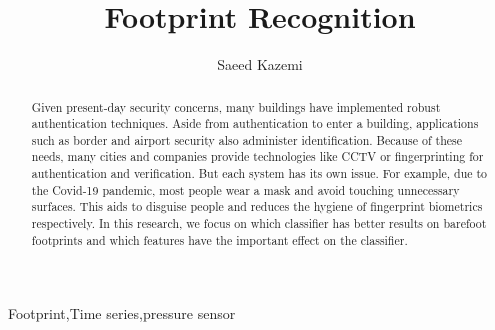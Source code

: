 \begin{frontmatter}

\title{Footprint Recognition}


\author{Saeed Kazemi}
\address{University of New Brunswick}


\begin{abstract}
Given present-day security concerns, many buildings have implemented robust authentication techniques. Aside from authentication to enter a building, applications such as border and airport security also administer identification. Because of these needs, many cities and companies provide technologies like CCTV or fingerprinting for authentication and verification. But each system has its own issue. For example, due to the Covid-19 pandemic, most people wear a mask and avoid touching unnecessary surfaces. This aids to disguise people and reduces the hygiene of fingerprint biometrics respectively. In this research, we focus on which classifier has better results on barefoot footprints and which features have the important effect on the classifier.
\end{abstract}

\begin{keyword}
Footprint\sep Time series\sep pressure sensor
\end{keyword}

\end{frontmatter}